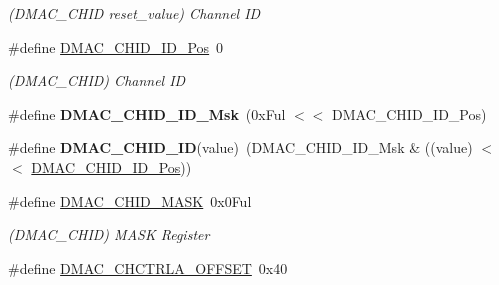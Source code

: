 \begin{DoxyCompactItemize}
\begin{DoxyCompactList}\small\item\em (D\+M\+A\+C\+\_\+\+C\+H\+I\+D reset\+\_\+value) Channel I\+D \end{DoxyCompactList}\item 
\hypertarget{group___s_a_m_l21___d_m_a_c_gadd98c1694377b5bb1a53b33057d6460b}{}\#define \hyperlink{group___s_a_m_l21___d_m_a_c_gadd98c1694377b5bb1a53b33057d6460b}{D\+M\+A\+C\+\_\+\+C\+H\+I\+D\+\_\+\+I\+D\+\_\+\+Pos}~0\label{group___s_a_m_l21___d_m_a_c_gadd98c1694377b5bb1a53b33057d6460b}

\begin{DoxyCompactList}\small\item\em (D\+M\+A\+C\+\_\+\+C\+H\+I\+D) Channel I\+D \end{DoxyCompactList}\item 
\hypertarget{group___s_a_m_l21___d_m_a_c_ga13c87f8311b7e73880303b73611d7f8c}{}\#define {\bfseries D\+M\+A\+C\+\_\+\+C\+H\+I\+D\+\_\+\+I\+D\+\_\+\+Msk}~(0x\+Ful $<$$<$ D\+M\+A\+C\+\_\+\+C\+H\+I\+D\+\_\+\+I\+D\+\_\+\+Pos)\label{group___s_a_m_l21___d_m_a_c_ga13c87f8311b7e73880303b73611d7f8c}

\item 
\hypertarget{group___s_a_m_l21___d_m_a_c_ga29602254ebe1642d2db7babefd6113c0}{}\#define {\bfseries D\+M\+A\+C\+\_\+\+C\+H\+I\+D\+\_\+\+I\+D}(value)~(D\+M\+A\+C\+\_\+\+C\+H\+I\+D\+\_\+\+I\+D\+\_\+\+Msk \& ((value) $<$$<$ \hyperlink{group___s_a_m_l21___d_m_a_c_gadd98c1694377b5bb1a53b33057d6460b}{D\+M\+A\+C\+\_\+\+C\+H\+I\+D\+\_\+\+I\+D\+\_\+\+Pos}))\label{group___s_a_m_l21___d_m_a_c_ga29602254ebe1642d2db7babefd6113c0}

\item 
\hypertarget{group___s_a_m_l21___d_m_a_c_ga831d21426d638b1c0f402d6db4ceddf5}{}\#define \hyperlink{group___s_a_m_l21___d_m_a_c_ga831d21426d638b1c0f402d6db4ceddf5}{D\+M\+A\+C\+\_\+\+C\+H\+I\+D\+\_\+\+M\+A\+S\+K}~0x0\+Ful\label{group___s_a_m_l21___d_m_a_c_ga831d21426d638b1c0f402d6db4ceddf5}

\begin{DoxyCompactList}\small\item\em (D\+M\+A\+C\+\_\+\+C\+H\+I\+D) M\+A\+S\+K Register \end{DoxyCompactList}\item 
\hypertarget{group___s_a_m_l21___d_m_a_c_ga85ef70390b4b949c408381f31817adde}{}\#define \hyperlink{group___s_a_m_l21___d_m_a_c_ga85ef70390b4b949c408381f31817adde}{D\+M\+A\+C\+\_\+\+C\+H\+C\+T\+R\+L\+A\+\_\+\+O\+F\+F\+S\+E\+T}~0x40\label{group___s_a_m_l21___d_m_a_c_ga85ef70390b4b949c408381f31817adde}


\end{DoxyCompactItemize}
